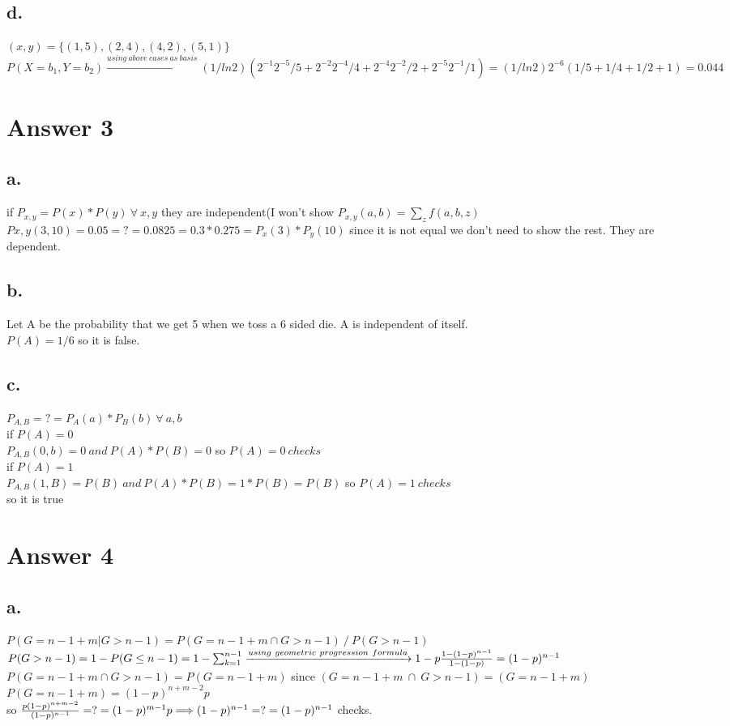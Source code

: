 \documentclass[12pt]{article}
\begin{document}
\subsection*{d.}
$(x,y)=\{(1,5),(2,4),(4,2),(5,1) \}$\\
$P(X=b_1,Y=b_2)\xrightarrow{using\ above\ cases\ as \ basis}(1/ln2)(2^{-1}2^{-5}/5+2^{-2}2^{-4}/4+2^{-4}2^{-2}/2+2^{-5}2^{-1}/1)=(1/ln2)2^{-6}(1/5+1/4+1/2+1)=0.044$



\section*{Answer 3}

\subsection*{a.}
if $P_{x,y}=P(x)*P(y)\ \forall \ x,y  $ they are independent(I won't show $P_{x,y}(a,b)=\sum_z  f(a,b,z) $ \\
$ P{x,y}(3,10)=0.05=?=0.0825=0.3*0.275=P_x(3)*P_y(10)  $ since it is not equal we don't need to show the rest. They are dependent.
\subsection*{b.}
Let A be the probability that we get 5 when we toss a 6 sided die. A is independent of itself. \\
$P(A)=1/6  $ so it is false.
\subsection*{c.}
$P_{A,B}=?=P_A(a)*P_B(b) \  \forall \ a,b  $ \\
if $P(A)=0$\\
$P_{A,B}(0,b)=0 \  and \ P(A)*P(B)=0  $  so $P(A)=0 \ checks$\\
if $P(A)=1$ \\
$P_{A,B}(1,B)=P(B) \ and \ P(A)*P(B)=1*P(B)=P(B)$ so $P(A)=1 \ checks$ \\
so it is true

\section*{Answer 4}

\subsection*{a.}
$P(G=n-1+m | G>n-1)=P(G=n-1+m \cap G>n-1) \ / \ P(G>n-1)$\\
$P(G>n-1)=1-P(G \leq n-1)=1- \sum_{k=1}^{n-1} \xrightarrow{using\ geometric\ progression\ formula} 1 - p{1-(1-p)^{n-1} \over1-(1-p)}=(1-p)^{n-1}$\\
$P(G=n-1+m \cap G>n-1)=P(G=n-1+m)  $ since $(G=n-1+m\  \cap \ G>n-1)=(G=n-1+m)$ \\
$P(G=n-1+m)=(1-p)^{n+m-2}p $ \\ 
so ${p(1-p)^{n+m-2} \over(1-p)^{n-1}}=?=(1-p)^{m-1}p \Longrightarrow (1-p)^{n-1}=?=(1-p)^{n-1}$ checks.
\end{document}
